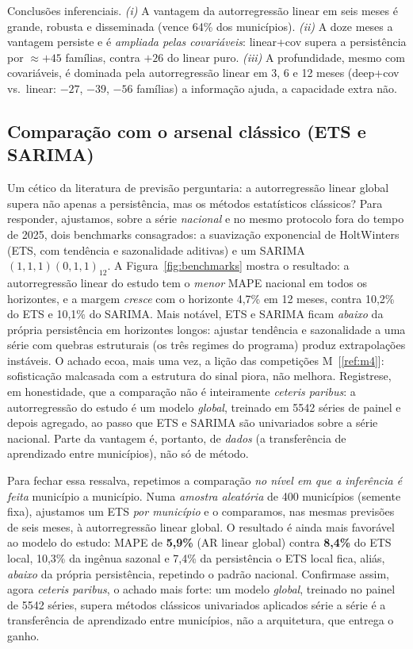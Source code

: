 \documentclass[12pt,a4paper,oneside]{article}
\newcommand{\C}[1]{[\ref{#1}]}
\begin{document}
Conclusões inferenciais. \emph{(i)} A vantagem da autorregressão linear em
seis meses é grande, robusta e disseminada (vence 64\% dos municípios).
\emph{(ii)} A doze meses a vantagem persiste e é \emph{ampliada pelas
covariáveis}: linear+cov supera a persistência por $\approx{+}45$ famílias,
contra $+26$ do linear puro. \emph{(iii)} A profundidade, mesmo com
covariáveis, é dominada pela autorregressão linear em 3, 6 e 12 meses
(deep+cov vs.\ linear: $-27$, $-39$, $-56$ famílias) \textemdash{} a
informação ajuda, a capacidade extra não.

\subsection{Comparação com o arsenal clássico (ETS e SARIMA)}

Um cético da literatura de previsão perguntaria: a autorregressão linear
global supera não apenas a persistência, mas os métodos estatísticos
clássicos? Para responder, ajustamos, sobre a série \emph{nacional} e no
mesmo protocolo fora do tempo de 2025, dois benchmarks consagrados: a
suavização exponencial de Holt\-Winters (ETS, com tendência e sazonalidade
aditivas) e um SARIMA $(1,1,1)(0,1,1)_{12}$. A
Figura~\ref{fig:benchmarks} mostra o resultado: a autorregressão linear do
estudo tem o \emph{menor} MAPE nacional em todos os horizontes, e a margem
\emph{cresce} com o horizonte \textemdash{} 4,7\% em 12 meses, contra
10,2\% do ETS e 10,1\% do SARIMA. Mais notável, ETS e SARIMA ficam
\emph{abaixo} da própria persistência em horizontes longos: ajustar
tendência e sazonalidade a uma série com quebras estruturais (os três
regimes do programa) produz extrapolações instáveis. O achado ecoa, mais
uma vez, a lição das competições M~\C{ref:m4}: sofisticação mal\-casada com
a estrutura do sinal piora, não melhora. Registre\-se, em honestidade, que
a comparação não é inteiramente \emph{ceteris paribus}: a autorregressão do
estudo é um modelo \emph{global}, treinado em \num{5542} séries de painel e
depois agregado, ao passo que ETS e SARIMA são univariados sobre a série
nacional. Parte da vantagem é, portanto, de \emph{dados} (a transferência de
aprendizado entre municípios), não só de método.

Para fechar essa ressalva, repetimos a comparação \emph{no nível em que a
inferência é feita} \textemdash{} município a município. Numa \emph{amostra
aleatória} de 400 municípios (semente fixa), ajustamos um ETS \emph{por município} e o comparamos, nas mesmas
previsões de seis meses, à autorregressão linear global. O resultado é ainda
mais favorável ao modelo do estudo: MAPE de \textbf{5,9\%} (AR linear global)
contra \textbf{8,4\%} do ETS local, 10,3\% da ingênua sazonal e 7,4\% da
persistência \textemdash{} o ETS local fica, aliás, \emph{abaixo} da própria
persistência, repetindo o padrão nacional. Confirma\-se assim, agora
\emph{ceteris paribus}, o achado mais forte: um modelo \emph{global},
treinado no painel de \num{5542} séries, supera métodos clássicos univariados
aplicados série a série \textemdash{} é a transferência de aprendizado entre
municípios, não a arquitetura, que entrega o ganho.
\end{document}
